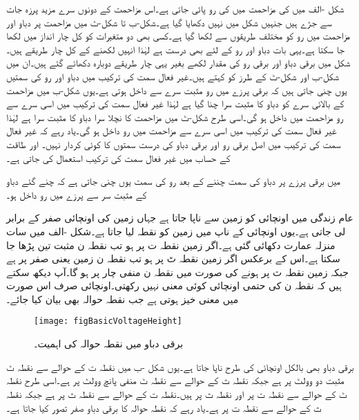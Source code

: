 شکل -الف میں  کی مزاحمت میں  کی رو پائی جاتی ہے۔اس مزاحمت کے دونوں سرے مزید پرزہ جات سے جڑے ہیں جنہیں شکل میں نہیں دکھایا گیا ہے۔شکل-ب تا شکل-ٹ میں مزاحمت پر دباو اور مزاحمت میں رو کو مختلف طریقوں سے لکھا گیا ہے۔کسی بھی دو متغیرات کو کل چار انداز میں لکھا جا سکتا ہے۔یہی بات دباو اور رو کے لئے بھی درست ہے لہٰذا انہیں لکھنے کے کل چار طریقے ہیں۔شکل  میں برقی دباو اور برقی رو کی مقدار لکھے بغیر یہی چار طریقے دوبارہ دکھائے گئے ہیں۔ان میں شکل-ب اور شکل-ٹ کے طرز کو  کہتے ہیں۔غیر فعال سمت کی ترکیب میں دباو  اور رو  کی سمتیں یوں چنی جاتی ہیں کہ برقی پرزے میں رو مثبت سرے سے داخل ہوتی ہے۔یوں شکل-ب میں مزاحمت کے بالائی سرے کو دباو کا مثبت سرا چنا گیا ہے لہٰذا غیر فعال سمت کی ترکیب میں اسی سرے سے رو مزاحمت میں داخل ہو گی۔اسی طرح شکل-ٹ میں مزاحمت کا نچلا سرا دباو کا مثبت سرا ہے لہٰذا غیر فعال سمت کی ترکیب میں اسی سرے سے مزاحمت میں رو داخل ہو گی۔یاد رہے کہ غیر فعال سمت کی ترکیب میں اصل برقی رو اور برقی دباو کی درست سمتوں کا کوئی کردار نہیں۔ اور طاقت کے حساب میں غیر فعال سمت کی ترکیب استعمال کی جاتی ہے۔

 میں برقی پرزے پر دباو کی سمت چننے کے بعد رو کی سمت یوں چنی جاتی ہے کہ چنے گئے دباو کے مثبت سر سے پرزے میں  رو داخل ہو۔

عام زندگی میں اونچائی کو زمین سے ناپا جاتا ہے جہاں زمین کی اونچائی صفر کے برابر لی جاتی ہے۔یوں اونچائی کے ناپ میں زمین کو نقطہ  لیا جاتا ہے۔شکل -الف میں سات منزلہ عمارت دکھائی گئی ہے۔اگر زمین نقطہ ت پر ہو تب نقطہ ن مثبت تین پڑھا جا سکتا ہے۔اس کے برعکس اگر زمین نقطہ ٹ پر ہو تب نقطہ ن زمین یعنی صفر پر ہے جبکہ زمین نقطہ ث پر ہونے کی صورت میں نقطہ ن منفی چار پر ہو گا۔آپ دیکھ سکتے ہیں کہ نقطہ ن کی حتمی اونچائی کوئی معنی نہیں رکھتی۔اونچائی صرف اس صورت میں معنی خیز ہوتی ہے جب نقطہ حوالہ بھی بیان کیا جائے۔
\begin{figure}
\centering
\texttt{[image: figBasicVoltageHeight]}
\caption{برقی دباو میں نقطہ حوالہ کی اہمیت۔}
\label{شکل_بنیادی_دباو_اور_اونچائی}
\end{figure}

برقی دباو بھی بالکل اونچائی کی طرح ناپا جاتا ہے۔یوں شکل -ب میں نقطہ ت کے حوالے سے نقطہ ٹ مثبت دو وولٹ  پر ہے جبکہ نقطہ ث کے حوالے سے نقطہ ٹ منفی پانچ وولٹ  پر ہے۔اسی طرح نقطہ ٹ کے حوالے سے نقطہ ت  پر اور نقطہ ث  پر ہیں۔نقطہ ت کے حوالے سے نقطہ ث  پر ہے جبکہ نقطہ ث کے حوالے سے نقطہ ت  پر ہے۔یاد رہے کہ نقطہ حوالہ کا برقی دباو صفر تصور کیا جاتا ہے۔

